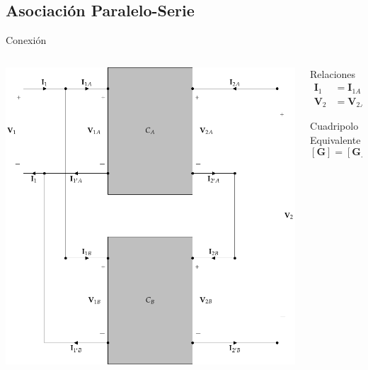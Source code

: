 \documentclass[aspectratio=169, usenames,svgnames,dvipsnames]{beamer}
\begin{document}
\subsection{Asociación Paralelo-Serie}
\label{sec:org7259ee1}
\begin{frame}[label={sec:orge408c77}]{Conexión}
\begin{columns}
\begin{column}{0.5\columnwidth}
\begin{center}
\includegraphics[height=0.75\textheight]{../figs/paralelo-serie.pdf}
\end{center}
\end{column}
\begin{column}{0.5\columnwidth}
\begin{block}{Relaciones}
\begin{align*}
  \mathbf{I}_1 &= \mathbf{I}_{1A} + \mathbf{I}_{1B}\\
  \mathbf{V}_2 &= \mathbf{V}_{2A} + \mathbf{V}_{2B}
\end{align*}
\end{block}

\begin{block}{Cuadripolo Equivalente}
\[
  \boxed{[\mathbf{G}] = [\mathbf{G}_A] + [\mathbf{G}_B]}
\]
\end{block}
\end{column}
\end{columns}
\end{frame}
\end{document}
